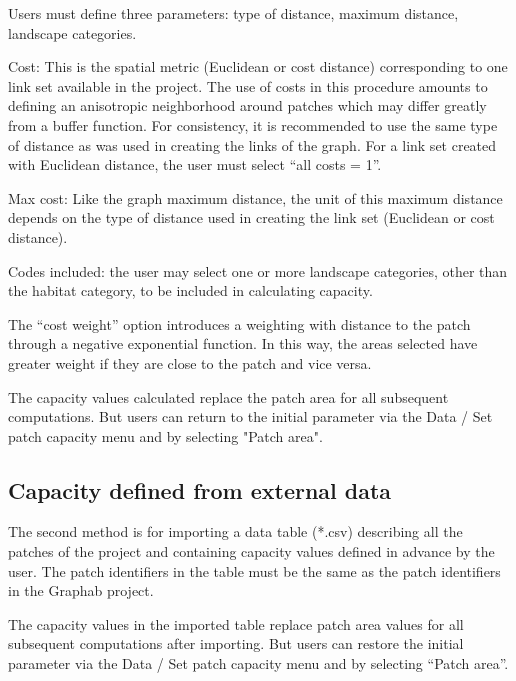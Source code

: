 \documentclass{article}
\begin{document}
Users must define three parameters: type of distance, maximum distance, landscape categories.

Cost: This is the spatial metric (Euclidean or cost distance) corresponding to one link set available in the project. The use of costs in this procedure amounts to defining an anisotropic neighborhood around patches which may differ greatly from a buffer function. For consistency, it is recommended to use the same type of distance as was
used in creating the links of the graph. For a link set created with Euclidean distance, the user must select “all costs = 1”.

Max cost: Like the graph maximum distance, the unit of this maximum distance depends on the type of distance used in creating the link set (Euclidean or cost distance).

Codes included: the user may select one or more landscape categories, other than the habitat category, to be included in calculating capacity.

The “cost weight” option introduces a weighting with distance to the patch through a negative exponential function. In this way, the areas selected have greater weight if they are close to the patch and vice versa.

The capacity values calculated replace the patch area for all subsequent computations. But users can return to the initial parameter via the Data / Set patch capacity menu and by selecting "Patch area".

\subsection{Capacity defined from external data}

The second method is for importing a data table (*.csv) describing all the patches of the project and containing capacity values defined in advance by the user. The patch identifiers in the table must be the same as the patch identifiers in the Graphab project.

The capacity values in the imported table replace patch area values for all subsequent computations after importing. But users can restore the initial parameter via the Data / Set patch capacity menu and by selecting “Patch area”.
\end{document}
